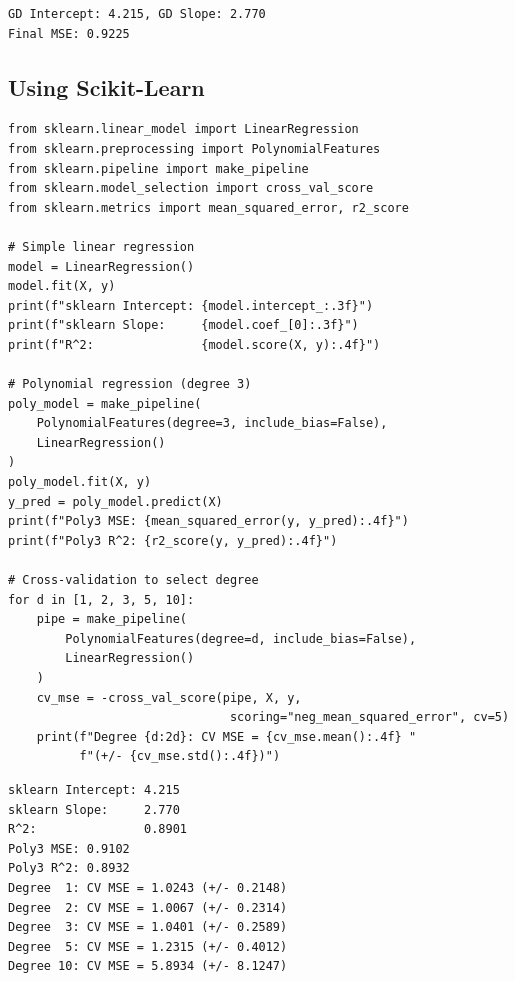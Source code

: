 \begin{codeoutput}
\begin{verbatim}
GD Intercept: 4.215, GD Slope: 2.770
Final MSE: 0.9225
\end{verbatim}
\end{codeoutput}

\subsection{Using Scikit-Learn}

\begin{codeblock}[title=\textbf{Linear and Polynomial Regression with scikit-learn}]
\begin{verbatim}
from sklearn.linear_model import LinearRegression
from sklearn.preprocessing import PolynomialFeatures
from sklearn.pipeline import make_pipeline
from sklearn.model_selection import cross_val_score
from sklearn.metrics import mean_squared_error, r2_score

# Simple linear regression
model = LinearRegression()
model.fit(X, y)
print(f"sklearn Intercept: {model.intercept_:.3f}")
print(f"sklearn Slope:     {model.coef_[0]:.3f}")
print(f"R^2:               {model.score(X, y):.4f}")

# Polynomial regression (degree 3)
poly_model = make_pipeline(
    PolynomialFeatures(degree=3, include_bias=False),
    LinearRegression()
)
poly_model.fit(X, y)
y_pred = poly_model.predict(X)
print(f"Poly3 MSE: {mean_squared_error(y, y_pred):.4f}")
print(f"Poly3 R^2: {r2_score(y, y_pred):.4f}")

# Cross-validation to select degree
for d in [1, 2, 3, 5, 10]:
    pipe = make_pipeline(
        PolynomialFeatures(degree=d, include_bias=False),
        LinearRegression()
    )
    cv_mse = -cross_val_score(pipe, X, y,
                               scoring="neg_mean_squared_error", cv=5)
    print(f"Degree {d:2d}: CV MSE = {cv_mse.mean():.4f} "
          f"(+/- {cv_mse.std():.4f})")
\end{verbatim}
\end{codeblock}

\begin{codeoutput}
\begin{verbatim}
sklearn Intercept: 4.215
sklearn Slope:     2.770
R^2:               0.8901
Poly3 MSE: 0.9102
Poly3 R^2: 0.8932
Degree  1: CV MSE = 1.0243 (+/- 0.2148)
Degree  2: CV MSE = 1.0067 (+/- 0.2314)
Degree  3: CV MSE = 1.0401 (+/- 0.2589)
Degree  5: CV MSE = 1.2315 (+/- 0.4012)
Degree 10: CV MSE = 5.8934 (+/- 8.1247)
\end{verbatim}
\end{codeoutput}

